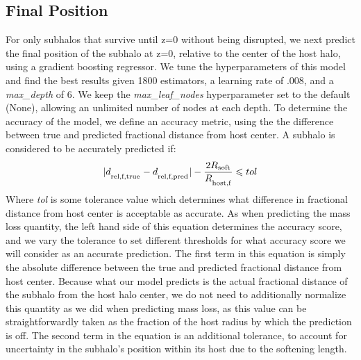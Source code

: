 \documentclass[fleqn,usenatbib]{mnras}
\begin{document}
\subsection{Final Position}
\label{sec:position}
For only subhalos that survive until z=0 without being disrupted, we next predict the final position of the subhalo at z=0, relative to the center of the host halo, using a gradient boosting regressor. We tune the hyperparameters of this model and find the best results given 1800 estimators, a learning rate of .008, and a \textit{max\_depth} of 6. We keep the \textit{max\_leaf\_nodes} hyperparameter set to the default (None), allowing an unlimited number of nodes at each depth. To determine the accuracy of the model, we define an accuracy metric, using the the difference between true and predicted fractional distance from host center. A subhalo is considered to be accurately predicted if:
\begin{equation}
    \label{eq:position}
    |d_\textsubscript{rel,f,true} - d_\textsubscript{rel,f,pred}| - \frac{2R\textsubscript{soft}}{R_\textsubscript{host,f}} \leq tol
\end{equation}
Where \textit{tol} is some tolerance value which determines what difference in fractional distance from host center is acceptable as accurate. As when predicting the mass loss quantity, the left hand side of this equation determines the accuracy score, and we vary the tolerance to set different thresholds for what accuracy score we will consider as an accurate prediction. The first term in this equation is simply the absolute difference between the true and predicted fractional distance from host center. Because what our model predicts is the actual fractional distance of the subhalo from the host halo center, we do not need to additionally normalize this quantity as we did when predicting mass loss, as this value can be straightforwardly taken as the fraction of the host radius by which the prediction is off. The second term in the equation is an additional tolerance, to account for uncertainty in the subhalo's position within its host due to the softening length.
\end{document}
